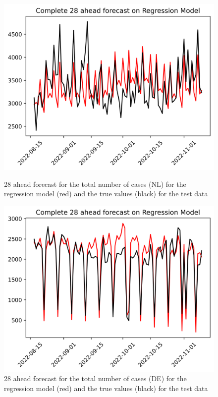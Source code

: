 \begin{figure}

\begin{minipage}{.45\textwidth}
  \centering
  \includegraphics[width=\linewidth]{pics/28_ah/Complete_28_ahead_Regression Model.png}
  \caption{28 ahead forecast for the total number of cases (NL) for the regression model (red) and the true values (black) for the test data}
  \label{fig:tot_cases_fc_28_RM}
\end{minipage}
\begin{minipage}{.45\textwidth}
  \centering
  \includegraphics[width=\linewidth]{pics/28_ah/DE_Complete_28_ahead_Regression Model.png}
  \caption{28 ahead forecast for the total number of cases (DE) for the regression model (red) and the true values (black) for the test data}
  \label{fig:tot_cases_fc_28_RM_DE}
\end{minipage}

\end{figure}
